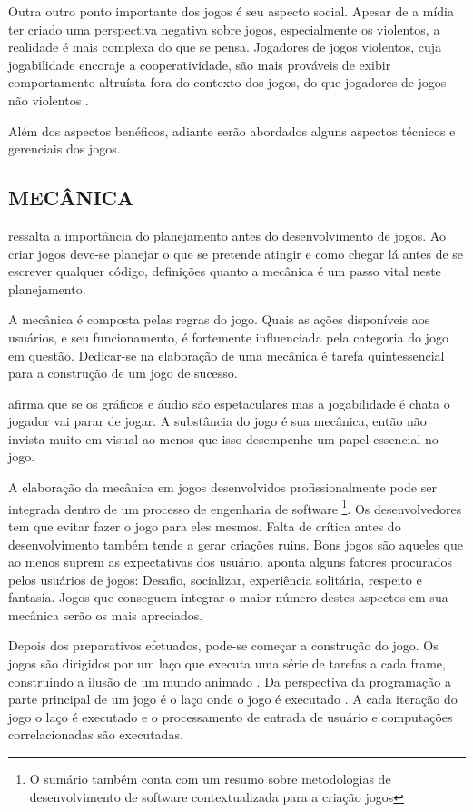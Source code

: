 Outra outro ponto importante dos jogos é seu aspecto social. Apesar de a
mídia ter criado uma perspectiva negativa sobre jogos, especialmente
os violentos, a realidade é mais complexa do que se pensa. Jogadores
de jogos violentos, cuja jogabilidade encoraje a cooperatividade, são
mais prováveis de exibir comportamento altruísta fora do contexto dos
jogos, do que jogadores de jogos não violentos \autocite{gamebenefits}.

Além dos aspectos benéficos, adiante serão abordados alguns aspectos técnicos 
e gerenciais dos jogos.

\subsection{MECÂNICA}

\cite{html5mostwanted} ressalta a importância do planejamento antes do
desenvolvimento de jogos. Ao criar jogos deve-se planejar o que se
pretende atingir e como chegar lá antes de se escrever qualquer
código, definições quanto a mecânica é um passo vital neste planejamento.

A mecânica é composta pelas regras do jogo. Quais as ações
disponíveis aos usuários, e seu funcionamento, é fortemente
influenciada pela categoria do jogo em questão. Dedicar-se na
elaboração de uma mecânica é tarefa quintessencial para a
construção de um jogo de sucesso.

\autocite{html5mostwanted} afirma que se os gráficos e áudio são
espetaculares mas a jogabilidade é chata o jogador vai parar de jogar.
A substância do jogo é sua mecânica, então não invista muito em
visual ao menos que isso desempenhe um papel essencial no jogo.

A elaboração da mecânica em jogos desenvolvidos profissionalmente
pode ser integrada dentro de um processo de engenharia de software
\footnote{O sumário também conta com um resumo sobre metodologias de
desenvolvimento de software contextualizada para a criação jogos}.
Os desenvolvedores tem que evitar fazer o jogo para eles mesmos.
Falta de crítica antes do desenvolvimento também tende a gerar criações ruins.
Bons jogos são aqueles que ao menos suprem as expectativas dos usuário.
\cite{indieGamesLemes} aponta alguns fatores procurados pelos usuários
de jogos: Desafio, socializar, experiência solitária, respeito e
fantasia. Jogos que conseguem integrar o maior número destes aspectos 
em sua mecânica serão os mais apreciados.

Depois dos preparativos efetuados, pode-se começar a construção
do jogo. Os jogos são dirigidos por um laço que executa uma série
de tarefas a cada frame, construindo a ilusão de um mundo animado
\autocite[pp. 31]{gwt}. Da perspectiva da programação a parte
principal de um jogo é o laço onde o jogo é executado \autocite[pp.
17]{crossPlatformMobileGameDevelopment}. A cada iteração do jogo
o laço é executado e o processamento de entrada de usuário e
computações correlacionadas são executadas.

